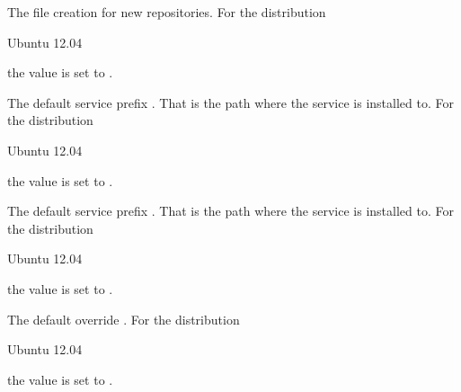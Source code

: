 
The file creation  for new repositories.
For the distribution
\begin{inparaitem}
\item[\TheDistribution{ubuntu}] Ubuntu 12.04
\end{inparaitem}
the value is set to .


The default service prefix . That is the path where the
service is installed to. 
For the distribution
\begin{inparaitem}
\item[\TheDistribution{ubuntu}] Ubuntu 12.04
\end{inparaitem}
the value is set to .


The default service prefix . That is the path where the
service is installed to. 
For the distribution
\begin{inparaitem}
\item[\TheDistribution{ubuntu}] Ubuntu 12.04
\end{inparaitem}
the value is set to .


The default override .
For the distribution
\begin{inparaitem}
\item[\TheDistribution{ubuntu}] Ubuntu 12.04
\end{inparaitem}
the value is set to .


